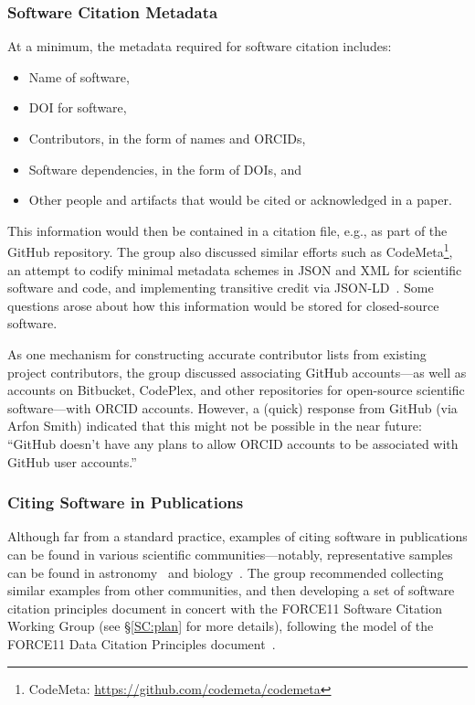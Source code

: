 \subsubsection{Software Citation Metadata}

At a minimum, the metadata required for software citation includes:
\begin{itemize}
    \item Name of software,
    \item DOI for software,
    \item Contributors, in the form of names and ORCIDs,
    \item Software dependencies, in the form of DOIs, and
    \item Other people and artifacts that would be cited or acknowledged in a paper.
\end{itemize}
This information would then be contained in a citation file, e.g., as part of
the GitHub repository. The group also discussed similar efforts such as
CodeMeta\footnote{CodeMeta: \url{https://github.com/codemeta/codemeta}}, an
attempt to codify minimal metadata schemes in JSON and XML for scientific
software and code, and implementing transitive credit via
JSON-LD~\cite{wssspe2_katz}. Some questions arose about how this information
would be stored for closed-source software.

As one mechanism for constructing accurate contributor lists from existing
project contributors, the group discussed associating GitHub accounts---as well
as accounts on Bitbucket, CodePlex, and other repositories for open-source
scientific software---with ORCID accounts. However, a (quick) response from
GitHub (via Arfon Smith) indicated that this might not be possible in the near
future: ``GitHub doesn't have any plans to allow ORCID accounts to be associated
with GitHub user accounts.''

\subsubsection{Citing Software in Publications}

Although far from a standard practice, examples of citing software in
publications can be found in various scientific communities---notably,
representative samples can be found in astronomy~\cite{astronomy_SW_examples}
and biology~\cite{Howison2015}. The group recommended collecting similar
examples from other communities, and then developing a set of software citation principles
document in concert with the FORCE11 Software Citation Working Group (see
\S\ref{SC:plan} for more details), following the model of the FORCE11 Data
Citation Principles document~\cite{DataCitation2014}.

